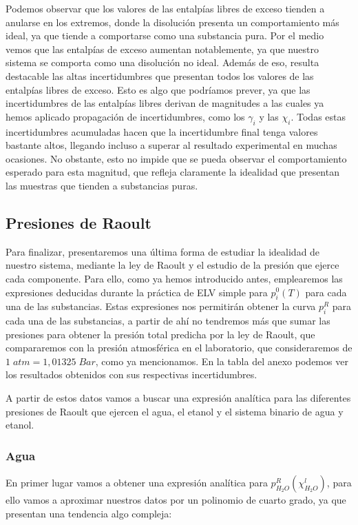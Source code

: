 \documentclass[a4paper,12pt,titlepage]{article}
\begin{document}
Podemos observar que los valores de las entalpías libres de exceso tienden a anularse en los extremos, donde la disolución presenta un comportamiento más ideal, ya que tiende a comportarse como una substancia pura. Por el medio vemos que las entalpías de exceso aumentan notablemente, ya que nuestro sistema se comporta como una disolución no ideal. Además de eso, resulta destacable las altas incertidumbres que presentan todos los valores de las entalpías libres de exceso. Esto es algo que podríamos prever, ya que las incertidumbres de las entalpías libres derivan de magnitudes a las cuales ya hemos aplicado propagación de incertidumbres, como los $\gamma_i$ y las $\chi_i$. Todas estas incertidumbres acumuladas hacen que la incertidumbre final tenga valores bastante altos, llegando incluso a superar al resultado experimental en muchas ocasiones. No obstante, esto no impide que se pueda observar el comportamiento esperado para esta magnitud, que refleja claramente la idealidad que presentan las muestras que tienden a substancias puras.


\subsection{Presiones de Raoult}

Para finalizar, presentaremos una última forma de estudiar la idealidad de nuestro sistema, mediante la ley de Raoult y el estudio de la presión que ejerce cada componente. Para ello, como ya hemos introducido antes, emplearemos las expresiones deducidas durante la práctica de ELV simple para $p_i^0(T)$ para cada una de las substancias. Estas expresiones nos permitirán obtener la curva $p^R_i$ para cada una de las substancias, a partir de ahí no tendremos más que sumar las presiones para obtener la presión total predicha por la ley de Raoult, que compararemos con la presión atmosférica en el laboratorio, que consideraremos de $1\; atm = 1,01325 \;Bar$, como ya mencionamos. En la tabla del anexo podemos ver los resultados obtenidos con sus respectivas incertidumbres.

A partir de estos datos vamos a buscar una expresión analítica para las diferentes presiones de Raoult que ejercen el agua, el etanol y el sistema binario de agua y etanol.

\subsubsection{Agua}

En primer lugar vamos a obtener una expresión analítica para $p_{H_2O}^R(\chi_{H_2O}^l)$, para ello vamos a aproximar nuestros datos por un polinomio de cuarto grado, ya que presentan una tendencia algo compleja:
\end{document}
